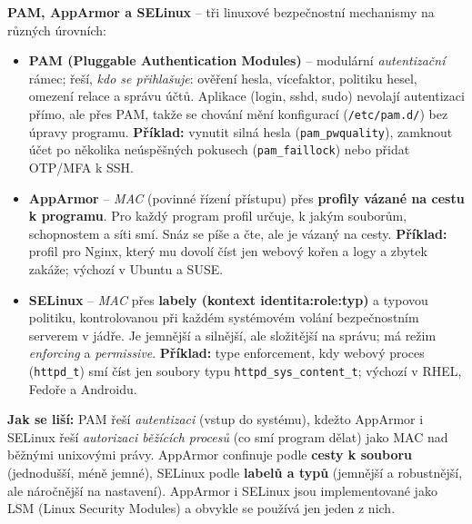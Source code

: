 \documentclass[11pt,a4paper]{article}
\begin{document}
\begin{notebox}
\textbf{PAM, AppArmor a SELinux} -- tři linuxové bezpečnostní mechanismy na různých úrovních:
\begin{itemize}
  \item \textbf{PAM (Pluggable Authentication Modules)} -- modulární \emph{autentizační} rámec; řeší, \emph{kdo se přihlašuje}: ověření hesla, vícefaktor, politiku hesel, omezení relace a správu účtů. Aplikace (login, sshd, sudo) nevolají autentizaci přímo, ale přes PAM, takže se chování mění konfigurací (\texttt{/etc/pam.d/}) bez úpravy programu. \textbf{Příklad:} vynutit silná hesla (\texttt{pam\_pwquality}), zamknout účet po několika neúspěšných pokusech (\texttt{pam\_faillock}) nebo přidat OTP/MFA k SSH.
  \item \textbf{AppArmor} -- \emph{MAC} (povinné řízení přístupu) přes \textbf{profily vázané na cestu k programu}. Pro každý program profil určuje, k jakým souborům, schopnostem a síti smí. Snáz se píše a čte, ale je vázaný na cesty. \textbf{Příklad:} profil pro Nginx, který mu dovolí číst jen webový kořen a logy a zbytek zakáže; výchozí v Ubuntu a SUSE.
  \item \textbf{SELinux} -- \emph{MAC} přes \textbf{labely (kontext identita:role:typ)} a typovou politiku, kontrolovanou při každém systémovém volání bezpečnostním serverem v jádře. Je jemnější a silnější, ale složitější na správu; má režim \emph{enforcing} a \emph{permissive}. \textbf{Příklad:} type enforcement, kdy webový proces (\texttt{httpd\_t}) smí číst jen soubory typu \texttt{httpd\_sys\_content\_t}; výchozí v RHEL, Fedoře a Androidu.
\end{itemize}
\textbf{Jak se liší:} PAM řeší \emph{autentizaci} (vstup do systému), kdežto AppArmor i SELinux řeší \emph{autorizaci běžících procesů} (co smí program dělat) jako MAC nad běžnými unixovými právy. AppArmor confinuje podle \textbf{cesty k souboru} (jednodušší, méně jemné), SELinux podle \textbf{labelů a typů} (jemnější a robustnější, ale náročnější na nastavení). AppArmor i SELinux jsou implementované jako LSM (Linux Security Modules) a obvykle se používá jen jeden z nich.
\end{notebox}
\end{document}
